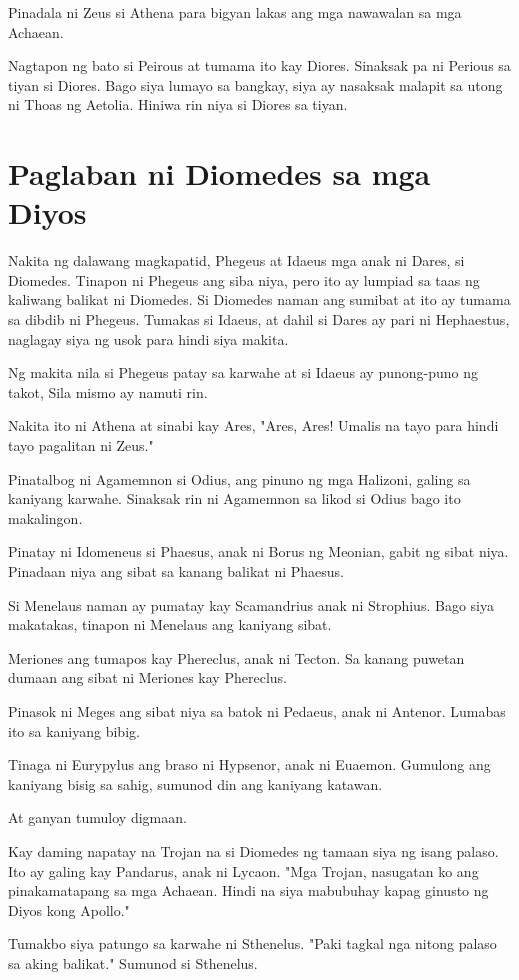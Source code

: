 \documentclass[12pt,letterpaper]{report}
\begin{document}
Pinadala ni Zeus si Athena para bigyan lakas ang mga nawawalan sa mga Achaean.

Nagtapon ng bato si Peirous at tumama ito kay Diores. Sinaksak pa ni Perious sa tiyan si Diores.
Bago siya lumayo sa bangkay, siya ay nasaksak malapit sa utong ni Thoas ng Aetolia.
Hiniwa rin niya si Diores sa tiyan.
\pagebreak
\chapter{Paglaban ni Diomedes sa mga Diyos}
Nakita ng dalawang magkapatid, Phegeus at Idaeus mga anak ni Dares, si Diomedes.
Tinapon ni Phegeus ang siba niya, pero ito ay lumpiad sa taas ng kaliwang balikat ni Diomedes.
Si Diomedes naman ang sumibat at ito ay tumama sa dibdib ni Phegeus. Tumakas si Idaeus,
at dahil si Dares ay pari ni Hephaestus, naglagay siya ng usok para hindi siya makita.

Ng makita nila si Phegeus patay sa karwahe at si Idaeus ay punong-puno ng takot,
Sila mismo ay namuti rin.

Nakita ito ni Athena at sinabi kay Ares, "Ares, Ares! Umalis na tayo para hindi tayo pagalitan ni Zeus."

Pinatalbog ni Agamemnon si Odius, ang pinuno ng mga Halizoni, galing sa kaniyang karwahe.
Sinaksak rin ni Agamemnon sa likod si Odius bago ito makalingon.

Pinatay ni Idomeneus si Phaesus, anak ni Borus ng Meonian, gabit ng sibat niya. Pinadaan niya ang sibat sa kanang balikat ni Phaesus.

Si Menelaus naman ay pumatay kay Scamandrius anak ni Strophius. Bago siya makatakas, tinapon ni Menelaus ang kaniyang sibat.

Meriones ang tumapos kay Phereclus, anak ni Tecton. Sa kanang puwetan dumaan ang sibat ni Meriones kay Phereclus.

Pinasok ni Meges ang sibat niya sa batok ni Pedaeus, anak ni Antenor. Lumabas ito sa kaniyang bibig.

Tinaga ni Eurypylus ang braso ni Hypsenor, anak ni Euaemon.
Gumulong ang kaniyang bisig sa sahig, sumunod din ang kaniyang katawan.

At ganyan tumuloy digmaan.

Kay daming napatay na Trojan na si Diomedes ng tamaan siya ng isang palaso. Ito ay galing kay Pandarus, anak ni Lycaon. "Mga Trojan,
nasugatan ko ang pinakamatapang sa mga Achaean. Hindi na siya mabubuhay kapag ginusto ng Diyos kong Apollo."

Tumakbo siya patungo sa karwahe ni Sthenelus. "Paki tagkal nga nitong palaso sa aking balikat." Sumunod si Sthenelus.
\end{document}
